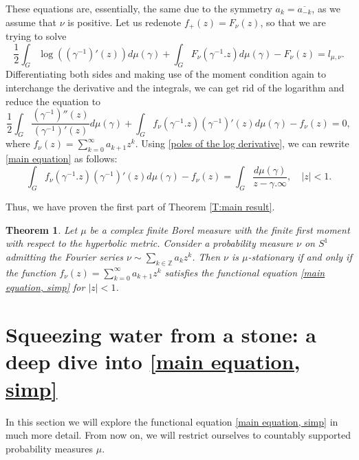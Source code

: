 \documentclass[11pt]{article}
\newtheorem{theorem}{Theorem}[section]
\begin{document}
These equations are, essentially, the same due to the symmetry $a_k = \overline{a_{-k}}$, as we assume that $\nu$ is positive. Let us redenote $f_+(z) = F_\nu(z)$, so that we are trying to solve
\begin{equation}
	\frac{1}{2} \int_G \log((\gamma^{-1})'(z))  d\mu(\gamma) + \int_G F_\nu(\gamma^{-1}.z)  d\mu(\gamma) - F_\nu(z) = l_{\mu, \nu}.
\end{equation}
Differentiating both sides and making use of the moment condition again to interchange the derivative and the integrals, we can get rid of the logarithm and reduce the equation to
\begin{equation}
	\label{main equation}
	\frac{1}{2} \int_G \frac{(\gamma^{-1})''(z)}{(\gamma^{-1})'(z)}  d\mu(\gamma) + \int_G f_\nu(\gamma^{-1}.z)(\gamma^{-1})'(z)  d\mu(\gamma) - f_\nu(z) = 0,
\end{equation}
where $f_\nu(z) = \sum_{k=0}^{\infty} a_{k+1} z^k$.
Using \eqref{poles of the log derivative}, we can rewrite \eqref{main equation} as follows:
\begin{equation}
	\label{main equation, simp}
	\int_G f_\nu(\gamma^{-1}.z)(\gamma^{-1})'(z)  d\mu(\gamma) - f_\nu(z) = \int_G \frac{d \mu(\gamma)}{z - \gamma.\infty}, \quad |z| < 1.
\end{equation}

Thus, we have proven the first part of Theorem \ref{T:main result}.

\begin{theorem}
	Let $\mu$ be a complex finite Borel measure with the finite first moment with respect to the hyperbolic metric. Consider a probability measure $\nu$ on $S^1$ admitting the Fourier series $\nu \sim \sum_{k \in \mathbb{Z}} a_k z^k$. Then $\nu$ is $\mu$-stationary if and only if the function $f_\nu(z) = \sum_{k=0}^\infty a_{k+1} z^k$ satisfies the functional equation \eqref{main equation, simp} for $|z| < 1$.
\end{theorem}


\section{Squeezing water from a stone: a deep dive into \eqref{main equation, simp}}
\label{Squeezing water from a stone}
In this section we will explore the functional equation \eqref{main equation, simp} in much more detail. From now on, we will restrict ourselves to countably supported probability measures $\mu$.
\end{document}
